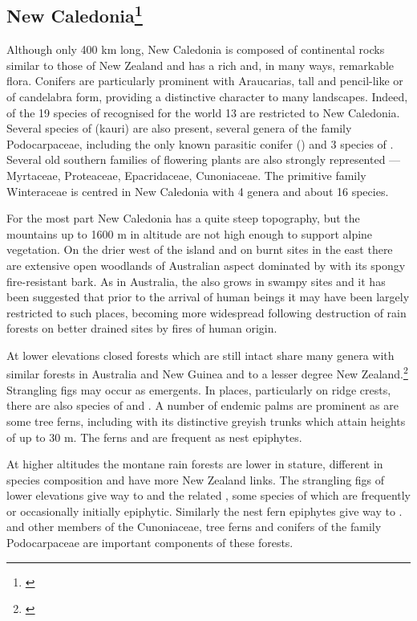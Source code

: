 \subsection[New Caledonia]{New Caledonia\footnote{\cite{schmid1981fleurs}}}

Although only 400 km long, New Caledonia is composed of continental rocks similar to those of New Zealand and has a rich and, in many ways, remarkable flora.
Conifers are particularly prominent with Araucarias, tall and pencil-like or of candelabra form, providing a distinctive character to many landscapes.
Indeed, of the 19 species of  recognised for the world 13 are restricted to New Caledonia.
Several species of  (kauri) are also present, several genera of the family Podocarpaceae, including the only known parasitic conifer () and 3 species of .
Several old southern families of flowering plants are also strongly represented --- Myrtaceae, Proteaceae, Epacridaceae, Cunoniaceae.
The primitive family Winteraceae is centred in New Caledonia with 4 genera and about 16 species.

For the most part New Caledonia has a quite steep topography, but the mountains up to 1600 m in altitude are not high enough to support alpine vegetation.
On the drier west of the island and on burnt sites in the east there are extensive open woodlands of Australian aspect dominated by  with its spongy fire-resistant bark.
As in Australia, the  also grows in swampy sites and it has been suggested that prior to the arrival of human beings it may have been largely restricted to such places, becoming more widespread following destruction of rain forests on better drained sites by fires of human origin.

At lower elevations closed forests which are still intact share many genera with similar forests in Australia and New Guinea and to a lesser degree New Zealand.\footnote{\cite{morat1986floristic}}
Strangling figs may occur as emergents.
In places, particularly on ridge crests, there are also species of  and .
A number of endemic palms are prominent as are some tree ferns, including  with its distinctive greyish trunks which attain heights of up to 30 m.
The ferns  and  are frequent as nest epiphytes.

At higher altitudes the montane rain forests are lower in stature, different in species composition and have more New Zealand links.
The strangling figs of lower elevations give way to  and the related , some species of which are frequently or occasionally initially epiphytic.
Similarly the nest fern epiphytes give way to .  and other members of the Cunoniaceae, tree ferns and conifers of the family Podocarpaceae are important components of these forests.

